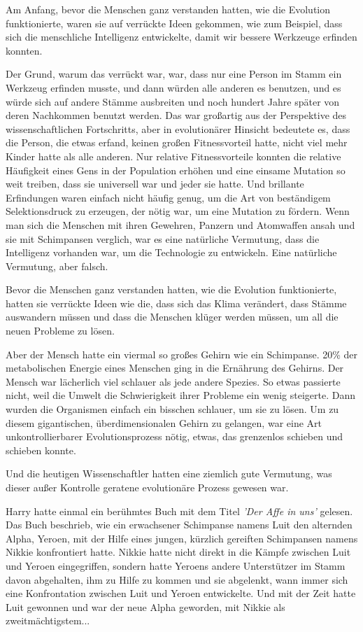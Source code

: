 Am Anfang, bevor die Menschen ganz verstanden hatten, wie die Evolution
funktionierte, waren sie auf verrückte Ideen gekommen, wie zum Beispiel, dass
sich die menschliche Intelligenz entwickelte, damit wir bessere Werkzeuge
erfinden konnten.

Der Grund, warum das verrückt war, war, dass nur eine Person im Stamm ein
Werkzeug erfinden musste, und dann würden alle anderen es benutzen, und es würde
sich auf andere Stämme ausbreiten und noch hundert Jahre später von deren
Nachkommen benutzt werden. Das war großartig aus der Perspektive des
wissenschaftlichen Fortschritts, aber in evolutionärer Hinsicht bedeutete es,
dass die Person, die etwas erfand, keinen großen Fitnessvorteil hatte, nicht
viel mehr Kinder hatte als alle anderen. Nur relative Fitnessvorteile konnten
die relative Häufigkeit eines Gens in der Population erhöhen und eine einsame
Mutation so weit treiben, dass sie universell war und jeder sie hatte. Und
brillante Erfindungen waren einfach nicht häufig genug, um die Art von
beständigem Selektionsdruck zu erzeugen, der nötig war, um eine Mutation zu
fördern. Wenn man sich die Menschen mit ihren Gewehren, Panzern und Atomwaffen
ansah und sie mit Schimpansen verglich, war es eine natürliche Vermutung, dass
die Intelligenz vorhanden war, um die Technologie zu entwickeln. Eine natürliche
Vermutung, aber falsch.

Bevor die Menschen ganz verstanden hatten, wie die Evolution funktionierte,
hatten sie verrückte Ideen wie die, dass sich das Klima verändert, dass Stämme
auswandern müssen und dass die Menschen klüger werden müssen, um all die neuen
Probleme zu lösen.

Aber der Mensch hatte ein viermal so großes Gehirn wie ein Schimpanse. 20\% der
metabolischen Energie eines Menschen ging in die Ernährung des Gehirns. Der
Mensch war lächerlich viel schlauer als jede andere Spezies. So etwas passierte
nicht, weil die Umwelt die Schwierigkeit ihrer Probleme ein wenig steigerte.
Dann wurden die Organismen einfach ein bisschen schlauer, um sie zu lösen. Um zu
diesem gigantischen, überdimensionalen Gehirn zu gelangen, war eine Art
unkontrollierbarer Evolutionsprozess nötig, etwas, das grenzenlos schieben und
schieben konnte.

Und die heutigen Wissenschaftler hatten eine ziemlich gute Vermutung, was dieser
außer Kontrolle geratene evolutionäre Prozess gewesen war.

Harry hatte einmal ein berühmtes Buch mit dem Titel \emph{'Der Affe in uns'}
gelesen. Das Buch beschrieb, wie ein erwachsener Schimpanse namens Luit den
alternden Alpha, Yeroen, mit der Hilfe eines jungen, kürzlich gereiften
Schimpansen namens Nikkie konfrontiert hatte. Nikkie hatte nicht direkt in die
Kämpfe zwischen Luit und Yeroen eingegriffen, sondern hatte Yeroens andere
Unterstützer im Stamm davon abgehalten, ihm zu Hilfe zu kommen und sie
abgelenkt, wann immer sich eine Konfrontation zwischen Luit und Yeroen
entwickelte. Und mit der Zeit hatte Luit gewonnen und war der neue Alpha
geworden, mit Nikkie als zweitmächtigstem...

